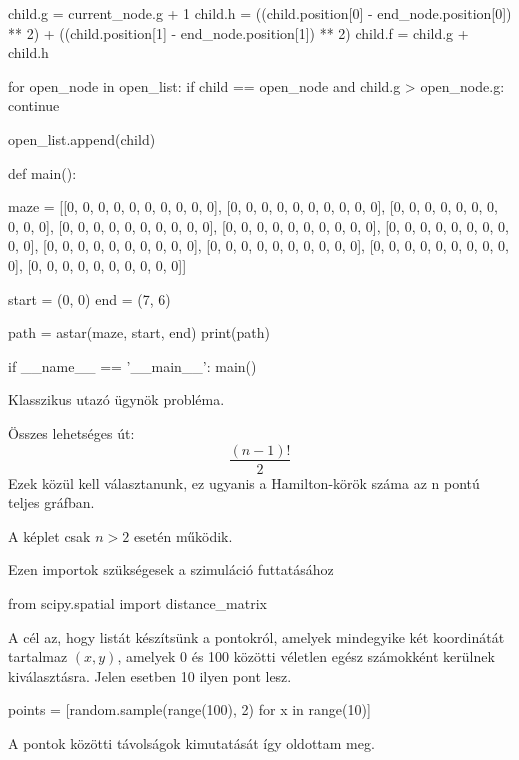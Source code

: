 \begin{python}
            child.g = current_node.g + 1
            child.h = ((child.position[0] - end_node.position[0]) ** 2) + ((child.position[1] - end_node.position[1]) ** 2)
            child.f = child.g + child.h

            for open_node in open_list:
                if child == open_node and child.g > open_node.g:
                    continue

            open_list.append(child)


def main():

    maze = [[0, 0, 0, 0, 0, 0, 0, 0, 0, 0],
            [0, 0, 0, 0, 0, 0, 0, 0, 0, 0],
            [0, 0, 0, 0, 0, 0, 0, 0, 0, 0],
            [0, 0, 0, 0, 0, 0, 0, 0, 0, 0],
            [0, 0, 0, 0, 0, 0, 0, 0, 0, 0],
            [0, 0, 0, 0, 0, 0, 0, 0, 0, 0],
            [0, 0, 0, 0, 0, 0, 0, 0, 0, 0],
            [0, 0, 0, 0, 0, 0, 0, 0, 0, 0],
            [0, 0, 0, 0, 0, 0, 0, 0, 0, 0],
            [0, 0, 0, 0, 0, 0, 0, 0, 0, 0]]

    start = (0, 0)
    end = (7, 6)

    path = astar(maze, start, end)
    print(path)


if __name__ == '__main__':
    main()

\end{python}


Klasszikus utazó ügynök probléma.

Összes lehetséges út:
\[
\dfrac{(n-1)!}{2}
\]
Ezek közül kell választanunk, ez ugyanis a Hamilton-körök száma az n pontú teljes gráfban.

A képlet csak $n > 2$ esetén működik.

Ezen importok szükségesek a szimuláció futtatásához

\begin{python}
from scipy.spatial import distance_matrix
\end{python}

A cél az, hogy listát készítsünk a pontokról, amelyek mindegyike két koordinátát tartalmaz $(x, y)$, amelyek 0 és 100 közötti véletlen egész számokként kerülnek kiválasztásra. Jelen esetben 10 ilyen pont lesz.

\begin{python}
points = [random.sample(range(100), 2) for x in range(10)]
\end{python}

A pontok közötti távolságok kimutatását így oldottam meg.

